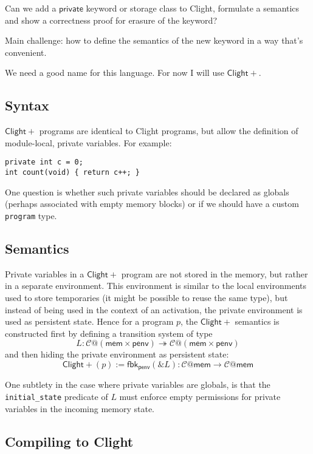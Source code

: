 \documentclass[acmsmall,screen,review,anonymous]{acmart}
\newcommand{\ClightP}{\ensuremath{\mathsf{Clight+}}}
\begin{document}
Can we add a $\mathsf{private}$ keyword or storage class to Clight,
formulate a semantics and show a correctness proof
for erasure of the keyword?

Main challenge: how to define the semantics of the new keyword
in a way that's convenient.

We need a good name for this language.
For now I will use \ClightP{}.

\subsection{Syntax}

\ClightP{} programs are identical to Clight programs,
but allow the definition of module-local, private variables.
For example:

\begin{verbatim}
private int c = 0;
int count(void) { return c++; }
\end{verbatim}

One question is whether such private variables
should be declared as globals
(perhaps associated with empty memory blocks)
or if we should have a custom \texttt{program} type.

\subsection{Semantics}

Private variables in a \ClightP{} program
are not stored in the memory,
but rather in a separate environment.
This environment is similar to
the local environments used to store temporaries
(it might be possible to reuse the same type),
but instead of being used in the context of an activation,
the private environment is used as persistent state.
Hence for a program $p$, the \ClightP{} semantics is constructed
first by defining a transition system of type
\[
  L : \mathcal{C}@(\mathsf{mem}\times\mathsf{penv}) \twoheadrightarrow
      \mathcal{C}@(\mathsf{mem}\times\mathsf{penv})
\]
and then hiding the private environment as persistent state:
\[
  \ClightP{}(p) := \mathsf{fbk}_\mathsf{penv}(\&L) :
    \mathcal{C}@\mathsf{mem} \rightarrow
    \mathcal{C}@\mathsf{mem}
\]

One subtlety in the case where private variables are globals,
is that the \texttt{initial\_state} predicate of $L$
must enforce empty permissions for private variables
in the incoming memory state.

\subsection{Compiling to Clight}
\end{document}
